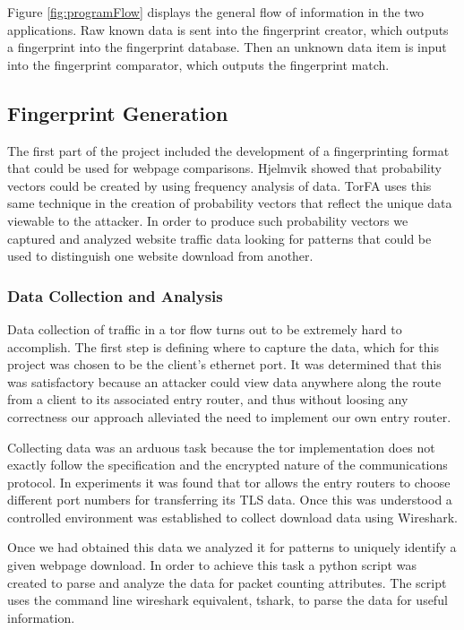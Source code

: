 \documentclass{article}
\begin{document}
Figure \ref{fig:programFlow} displays the general flow of information in the 
two applications. Raw known data is sent into the fingerprint creator, 
which outputs a fingerprint into the fingerprint database. Then an unknown
data item is input into the fingerprint comparator, which outputs the 
fingerprint match. 

\subsection{Fingerprint Generation}
The first part of the project included the development of a fingerprinting 
format that could be used for webpage comparisons. Hjelmvik \cite{spid}
showed that probability vectors could be created by using frequency 
analysis of data. TorFA uses this 
same technique in the creation of probability vectors that reflect the unique
data viewable to the attacker. In order to produce such probability vectors
we captured and analyzed website traffic data looking for
patterns that could be used to distinguish one website download from another. 

\subsubsection{Data Collection and Analysis}
Data collection of traffic in a tor flow turns out to be extremely hard to 
accomplish. The first step is defining where to capture the data, which for
this project was chosen to be the client's ethernet port. It was determined
that this was satisfactory because an attacker could view data anywhere along
the route from a client to its associated entry router, and thus without 
loosing any correctness our approach alleviated the need to implement our own 
entry router. 

Collecting data was an arduous task because the tor implementation
does not exactly follow the specification and the encrypted nature of the 
communications protocol. In experiments it was found that tor allows the 
entry routers to choose different port numbers for transferring its TLS data. 
Once this was understood a controlled environment was established to collect
download data using Wireshark. 

Once we had obtained this data we analyzed it for patterns to uniquely identify
a given webpage download. In order to achieve this task a python script was
created to parse and analyze the data for packet counting attributes. The script
uses the command line wireshark equivalent, tshark, to parse the data for useful
information. 
\end{document}
